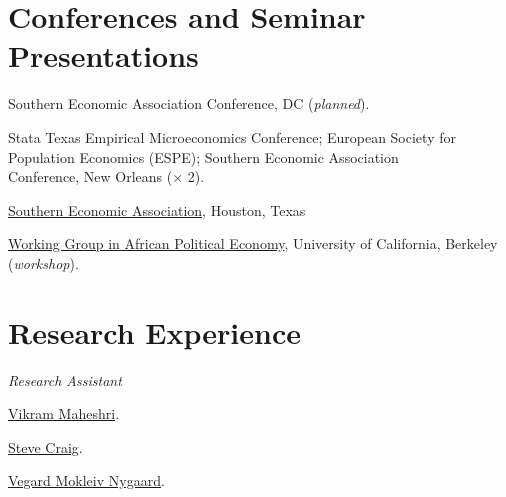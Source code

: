 \documentclass[letterpaper]{article}
\renewenvironment{itemize}{
  \begin{list}{}{
    \setlength{\leftmargin}{1.5em}
  }
}{
  \end{list}
}
\begin{document}
\section*{Conferences and Seminar Presentations}
\vspace{2 mm}
\begin{itemize}
\item {}Southern Economic Association Conference, DC (\textit{planned}).
\item {}Stata Texas Empirical Microeconomics Conference; European Society for \\{\makebox[1.8cm]{\hfill}}Population Economics (ESPE); Southern Economic Association \\{\makebox[1.8cm]{\hfill}}Conference, New Orleans ($\times$ 2).
\item {}\href{https://www.southerneconomic.org/session-details/?conferenceId=7&eventId=3353}%
{Southern Economic Association}, Houston, Texas
\item {}\href{https://cega.berkeley.edu/initiative/working-group-in-african-political-economy/}%
{Working Group in African Political Economy}, University of  California, Berkeley (\textit{workshop}).

\end{itemize}

\vspace{2 mm}

\section*{Research Experience}
\vspace{2 mm}
\textit{Research Assistant}
\begin{itemize}
\item {}\href{https://vmaheshri.github.io/}{Vikram Maheshri}.
\item {}\href{https://www.uh.edu/class/economics/people/current-faculty/steve/}{Steve Craig}.
\item {}\href{https://sites.google.com/site/vegardmokleivnygaard/}{Vegard Mokleiv Nygaard}.


\end{itemize}
\end{document}
